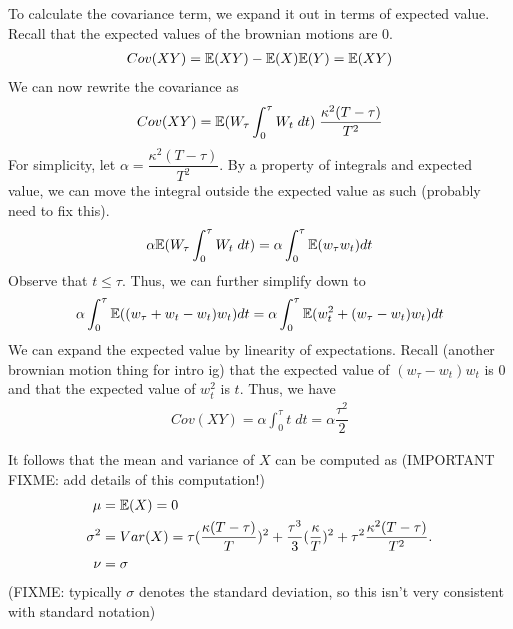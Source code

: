 \documentclass[reqno]{amsart}
\begin{document}
To calculate the covariance term, we expand it out in terms of expected value. Recall that the expected values of the brownian motions are 0.
\begin{align}
     Cov(XY) = \mathbb{E}(XY) - \mathbb{E}(X)\mathbb{E}(Y) = \mathbb{E}(XY)
\end{align}
We can now rewrite the covariance as
\begin{align}
     Cov(XY) = \mathbb{E}(W_\tau \int_0^\tau W_t \; dt) \;\dfrac{\kappa^2 (T - \tau)}{T^2}
\end{align}
For simplicity, let $\alpha = \dfrac{\kappa^2 (T - \tau)}{T^2}$. By a property of integrals and expected value, we can move the integral outside the expected value as such (probably need to fix this).
\begin{align}
     \alpha \mathbb{E}(W_\tau \int_0^\tau W_t \; dt) = \alpha \int_0^\tau \mathbb{E}(w_\tau w_t) dt
\end{align}
Observe that $t \leq \tau$. Thus, we can further simplify down to
\begin{align}
     \alpha \int_0^\tau \mathbb{E}((w_\tau + w_t - w_t) w_t) dt = \alpha \int_0^\tau \mathbb{E}(w_t^2 + (w_\tau - w_t) w_t) dt
\end{align}
We can expand the expected value by linearity of expectations. Recall (another brownian motion thing for intro ig) that the expected value of $(w_\tau - w_t) w_t$ is 0 and that the expected value of $w_t^2$ is $t$. Thus, we have
\begin{align}
     Cov(XY) = \alpha \int_0^\tau t \; dt = \alpha \dfrac{\tau^2}{2}
\end{align}

It follows that the mean and variance of $X$ can be computed as (IMPORTANT FIXME: add details of this computation!)
\begin{align}
     \mu &= \mathbb{E}(X) = 0\\
     \sigma^2 &= Var(X) = \tau(\frac{\kappa(T-\tau)}{T})^2 + \frac{\tau^3}{3}(\frac{\kappa}{T})^2 + \tau^2\frac{\kappa^2(T-\tau)}{T^2}.\\
     \nu &= \sigma
\end{align}
(FIXME: typically $\sigma$ denotes the standard deviation, so this isn't very consistent with standard notation)
\end{document}
